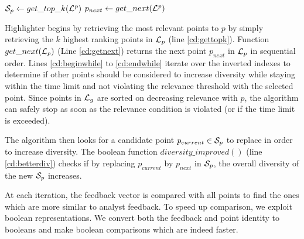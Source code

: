 \documentclass{vldb}
\begin{document}
\begin{algorithm}[t]
\DontPrintSemicolon
{}
${\cal S}_p \gets get\_top\_k(\mathit{{\cal L}^p})$\;\label{cd:gettopk}
$p_{next} \gets get\_next(\mathit{{\cal L}^p})$\;\label{cd:getnext}
\label{cd:endwhile}
\; 
\caption{{\sc Highlighter} Algorithm}
\label{algo:geoh}
\end{algorithm}

{\sc Highlighter} begins by retrieving the most relevant points to $p$ by simply retrieving the $k$ highest ranking points in ${\cal L}_p$ (line \ref{cd:gettopk}). Function $get\_next({\cal L}_p)$ (Line \ref{cd:getnext}) returns the next point $p_{next}$ in ${\cal L}_p$ in sequential order. Lines \ref{cd:beginwhile} to \ref{cd:endwhile} iterate over the inverted indexes to determine if other points should be considered to increase diversity while staying within the time limit and not violating the relevance threshold with the selected point. Since points in ${\cal L}_g$ are sorted on decreasing relevance with $p$, the algorithm can safely stop as soon as the relevance condition is violated (or if the time limit is exceeded).

The algorithm then looks for a candidate point $p_{current} \in {\cal S}_p$ to replace in order to increase diversity. The boolean function $\mathit{diversity\_improved}()$ (line \ref{cd:betterdiv}) checks if by replacing $p_{current}$ by $p_{next}$ in ${\cal S}_p$, the overall diversity of the new ${\cal S}_p$ increases.



At each iteration, the feedback vector is compared with all points to find the ones which are more similar to analyst feedback. To speed up comparison, we exploit boolean representations. We convert both the feedback and point identity to booleans and make boolean comparisons which are indeed faster.
\end{document}
